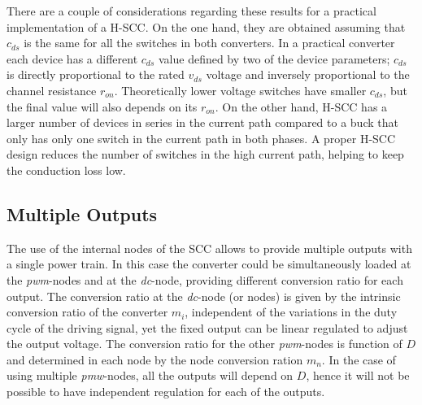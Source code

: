 There are a couple of considerations regarding these results for a practical implementation of a H-SCC. On the one hand, they are obtained assuming that $c_{ds}$ is the same for all the switches in both converters. In a practical converter each device has a different $c_{ds}$ value defined by two of the device parameters; $c_{ds}$ is directly proportional to the rated $v_{ds}$  voltage and inversely proportional to the channel resistance $r_{on}$. Theoretically lower voltage switches have smaller $c_{ds}$, but the final value will also depends on its $r_{on}$. On the other hand, H-SCC has a larger number of devices in series in the current path compared to a buck that only has only one switch in the current path in both phases. A proper H-SCC design reduces the number of switches in the high current path, helping to keep the conduction loss low. %



\subsection{Multiple Outputs}

The use of the internal nodes of the SCC allows to provide multiple outputs with a single power train. In this case the converter could be simultaneously loaded at the \emph{pwm}-nodes and at the \emph{dc}-node, providing different conversion ratio for each output. The conversion ratio at the \emph{dc}-node (or nodes)  is given by the intrinsic conversion ratio of the converter $m_i$, independent of the variations in the duty cycle of the driving signal, yet the fixed output can be linear regulated to adjust the output voltage.  The conversion ratio for the other \emph{pwm}-nodes is function of $D$ and determined in each node by the node conversion ration $m_n$. In the case of using multiple \emph{pmw}-nodes, all the outputs will depend on $D$, hence it will not be possible to have independent regulation for each of the outputs.

